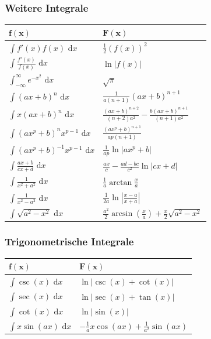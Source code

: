 \documentclass[a4paper,10pt]{article}
\def\dx{\text{ d}x}
\begin{document}
\subsubsection{Weitere Integrale}
\begin{center}
  \begin{tabularx}{\linewidth}{>{\centering\arraybackslash}X>{\centering\arraybackslash}X}
   \toprule
   $\mathbf{f(x)}$ & $\mathbf{F(x)}$ \\
   \midrule
   $\int f'(x) f(x) \dx$ & $\frac{1}{2}(f(x))^2$ \\
   $\int \frac{f'(x)}{f(x)} \dx$ & $\ln|f(x)|$ \\
   $\int_{-\infty}^\infty e^{-x^2} \dx$ & $\sqrt{\pi}$ \\
   $\int (ax+b)^n \dx$ & $\frac{1}{a(n+1)}(ax+b)^{n+1}$ \\
   $\int x(ax+b)^n \dx$ & $\frac{(ax+b)^{n+2}}{(n+2)a^2} - \frac{b(ax+b)^{n+1}}{(n+1)a^2}$ \\
   $\int (ax^p+b)^n x^{p-1} \dx$ & $\frac{(ax^p+b)^{n+1}}{ap(n+1)}$ \\
   $\int (ax^p + b)^{-1} x^{p-1} \dx$ & $\frac{1}{ap} \ln |ax^p + b|$ \\
   $\int \frac{ax+b}{cx+d} \dx$ & $\frac{ax}{c} - \frac{ad-bc}{c^2} \ln |cx +d|$ \\
   $\int \frac{1}{x^2+a^2} \dx$ & $\frac{1}{a} \arctan \frac{x}{a}$ \\
   $\int \frac{1}{x^2 - a^2} \dx$ & $\frac{1}{2a} \ln\left| \frac{x-a}{x+a} \right|$ \\
   $\int \sqrt{a^2 - x^2} \dx $ & $\frac{a^2}{2} \arcsin(\frac{x}{a}) + \frac{x}{2} \sqrt{a^2 - x^2}$ \\
   \bottomrule
  \end{tabularx} 
 \end{center}

 \subsubsection{Trigonometrische Integrale}

 \begin{center}
  \begin{tabularx}{\linewidth}{>{\centering\arraybackslash}X>{\centering\arraybackslash}X}
   \toprule
   $\mathbf{f(x)}$ & $\mathbf{F(x)}$ \\
   \midrule
   $\int \csc(x) \dx $ & $\ln|\csc(x) + \cot(x)|$ \\
   $\int \sec(x) \dx $ & $\ln|\sec(x) + \tan(x)|$ \\
   $\int \cot(x) \dx $ & $\ln|\sin(x)|$ \\
   $\int x \sin(ax) \dx$ & $-\frac{1}{a} x \cos(ax) + \frac{1}{a^2} \sin(ax)$ \\
   \bottomrule
  \end{tabularx} 
 \end{center}
\end{document}
